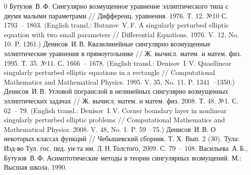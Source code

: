 \documentclass[12pt]{article}
\begin{document}
\begin{thebibliography} {0}  %
	Бутузов~В.\,Ф. Сингулярно возмущенное уравнение эллиптического типа с двумя малыми параметрами // Дифференц. уравнения. 1976. Т. 12. №10 С. 1793~-- 1803. (English transl.: Butuzov~V.\,F. A singularly perturbed elliptic equation with two small parameters // Differential Equations. 1976. V. 12, No. 10. P. 1261.)
	Денисов~И.\,В. Квазилинейные сингулярно возмущенные эллиптические уравнения в прямоугольнике // Ж. вычисл. матем. и матем. физ. 1995. Т. 35. №11. С. 1666~-- 1678. (English transl.: Denisov~I.\,V. Quasilinear singularly perturbed elliptic equations in a rectangle // Computational Mathematics and Mathematical Physics. 1995. V. 35, No. 11. P. 1341~--1350.)
	Денисов~И.\,В. Угловой погранслой в нелинейных сингулярно возмущенных эллиптических задачах // Ж. вычисл. матем. и матем. физ. 2008. Т. 48. №1. С. 62~-- 79. (English transl.: Denisov~I.\,V. Corner boundary layer in nonlinear singularly perturbed elliptic problems // Computational Mathematics and Mathematical Physics. 2008. V. 48, No. 1. P. 59~--75.)
	Денисов~И.\,В. О некоторых классах функций // Чебышевский сборник. Т. Х. Вып. 2 (30). Тула: Изд-во Тул. гос. пед. ун-та им. Л.\,Н.\,Толстого, 2009. С. 79~-- 108.
	Васильева~А.\,Б., Бутузов~В.\,Ф. Асимптотические методы в теории сингулярных возмущений. М.: Высшая школа, 1990.
\end{thebibliography}
\end{document}
